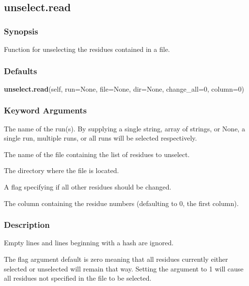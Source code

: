   

 \newpage 

 \subsection{unselect.read} 

  
 \subsubsection{Synopsis} 

 Function for unselecting the residues contained in a file. 
  

  
 \subsubsection{Defaults} 

 \textsf{\textbf{unselect.read}(self, run=None, file=None, dir=None, change\_all=0, column=0)} 

  
 \subsubsection{Keyword Arguments} 

   The name of the run(s).  By supplying a single string, array of strings, or None, a single run, multiple runs, or all runs will be selected respectively.   

   The name of the file containing the list of residues to unselect.   

   The directory where the file is located.   

   A flag specifying if all other residues should be changed.   

   The column containing the residue numbers (defaulting to 0, the first column).  

  

  
 \subsubsection{Description} 

 Empty lines and lines beginning with a hash are ignored. 
  

 The  flag argument default is zero meaning that all residues currently either selected or unselected will remain that way.  Setting the argument to 1 will cause all residues not specified in the file to be selected. 
  

